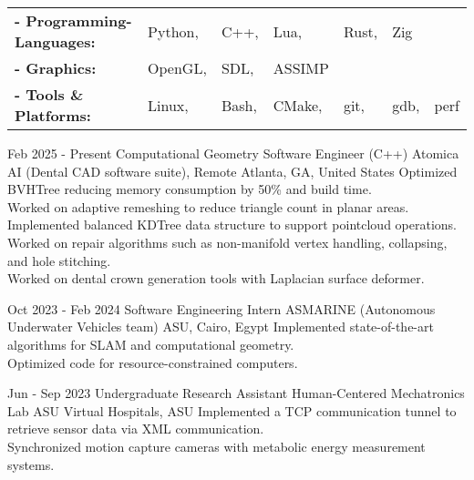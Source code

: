 \documentclass[]{report}
\begin{document}

\begin{tabular}{ l l l l l l l}
      \bf{- Programming-Languages:} & Python, & C++, & Lua, & Rust, & Zig\\ 
      \bf{- Graphics:} & OpenGL,&  SDL, & ASSIMP \\ 
      \bf{- Tools \& Platforms:} & Linux, & Bash, & CMake, & git, & gdb, & perf \\ 
       
\end{tabular}

\vspace{4mm}


\entry
    {Feb 2025 - Present}
    {Computational Geometry Software Engineer (C++)}
    {Atomica AI (Dental CAD software suite), Remote}
    {Atlanta, GA, United States}
    {
        \tb Optimized BVHTree reducing memory consumption by 50\% and build time.\\
        \tb Worked on adaptive remeshing to reduce triangle count in planar areas.\\
        \tb Implemented balanced KDTree data structure to support pointcloud operations.\\
        \tb Worked on repair algorithms such as non-manifold vertex handling, collapsing, and hole stitching.\\
        \tb Worked on dental crown generation tools with Laplacian surface deformer.\\
    }

\entry
    {Oct 2023 - Feb 2024}
    {Software Engineering Intern}
    {ASMARINE (Autonomous Underwater Vehicles team)}
    {ASU, Cairo, Egypt}
    {
      \tb Implemented state-of-the-art algorithms for SLAM and computational geometry.\\
      \tb Optimized code for resource-constrained computers.
    }

\entry
    {Jun - Sep 2023}
    {Undergraduate Research Assistant}
    {Human-Centered Mechatronics Lab}
    {ASU Virtual Hospitals, ASU}
    {
      \tb Implemented a TCP communication tunnel to retrieve sensor data via XML communication. \\
      \tb Synchronized motion capture cameras with metabolic energy measurement systems. \\
    }
\end{document}
